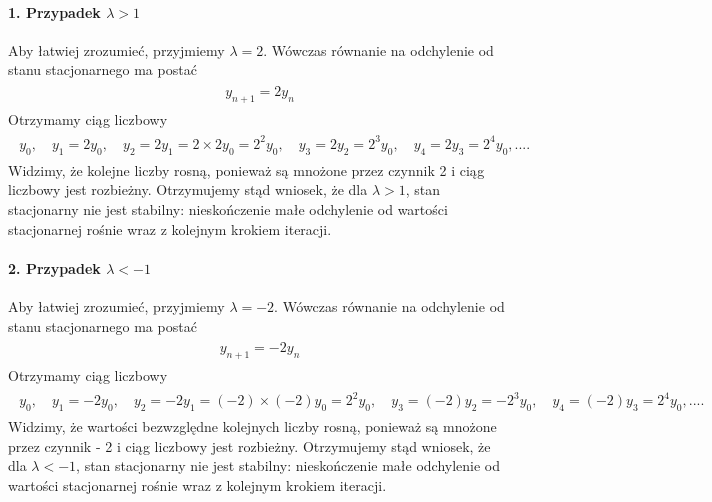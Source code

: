 \documentclass[a4paper,12pt,polish]{sphinxmanual}
\begin{document}
\paragraph{1. Przypadek $\lambda  > 1$}
\label{ch1/chI031:przypadek}
Aby łatwiej zrozumieć, przyjmiemy  $\lambda =  2$. Wówczas równanie na odchylenie od stanu stacjonarnego ma postać
\label{ch1/chI031:equation-eqn20}\begin{gather}
\begin{split}y_{n+1} = 2 y_n\end{split}\label{ch1/chI031-eqn20}
\end{gather}
Otrzymamy ciąg liczbowy
\label{ch1/chI031:equation-eqn21}\begin{gather}
\begin{split} y_0, \quad y_1 =   2 y_0, \quad y_2 =  2 y_1 =  2 \times 2 y_0 = 2^2 y_0, \quad y_3 =  2 y_2 = 2^3 y_0, \quad y_4 =  2 y_3 = 2^4 y_0, ....\end{split}\label{ch1/chI031-eqn21}
\end{gather}
Widzimy, że  kolejne  liczby rosną, ponieważ są mnożone przez czynnik 2 i ciąg liczbowy jest rozbieżny. Otrzymujemy stąd wniosek, że dla $\lambda > 1$, stan stacjonarny nie jest stabilny: nieskończenie małe odchylenie od wartości stacjonarnej rośnie wraz z kolejnym krokiem iteracji.


\paragraph{2. Przypadek $\lambda < -1$}
\label{ch1/chI031:id1}
Aby łatwiej zrozumieć, przyjmiemy  $\lambda = - 2$. Wówczas równanie na odchylenie od stanu stacjonarnego ma postać
\label{ch1/chI031:equation-eqn22}\begin{gather}
\begin{split}y_{n+1} = - 2 y_n\end{split}\label{ch1/chI031-eqn22}
\end{gather}
Otrzymamy ciąg liczbowy
\label{ch1/chI031:equation-eqn23}\begin{gather}
\begin{split} y_0, \quad y_1 = - 2 y_0, \quad y_2 = - 2 y_1 = (- 2)  \times (- 2) y_0 = 2^2 y_0, \quad y_3 = (- 2) y_2 =  - 2^3 y_0, \quad y_4 = (- 2) y_3 = 2^4 y_0, ....\end{split}\label{ch1/chI031-eqn23}
\end{gather}
Widzimy, że  wartości bezwzględne kolejnych liczby rosną, ponieważ są mnożone przez czynnik - 2 i ciąg liczbowy jest rozbieżny. Otrzymujemy stąd wniosek, że dla $\lambda < - 1$, stan stacjonarny nie jest stabilny: nieskończenie małe odchylenie od wartości stacjonarnej rośnie wraz z kolejnym krokiem iteracji.
\end{document}

